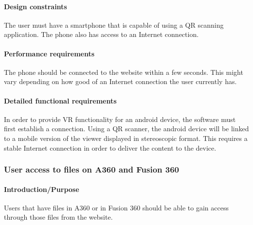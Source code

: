 \documentclass[letterpaper, 10pt, draftclsnofoot, compsoc, onecolumn]{IEEEtran}
\begin{document}
\paragraph[Design constraints of this
feature]{\rmfamily\bfseries\color{black} Design
constraints }
{\color{black}
	The user must have a smartphone that is capable of using a QR scanning application. The phone also has access to an Internet 
	connection. 
}

\paragraph[Performance requirements of this
feature]{\rmfamily\bfseries\color{black}
Performance requirements }
{\color{black}
	The phone should be connected to the website within a few seconds. This might vary depending on how good of an Internet 
	connection the user currently has. 
}

\paragraph[Detailed functional requirements of this
feature]{\rmfamily\bfseries\color{black}
Detailed functional requirements }
{\color{black}
	In order to provide VR functionality for an android device, the software must first establish a connection. Using a QR scanner, 
	the android device will be linked to a mobile version of the viewer displayed in stereoscopic format. This requires a stable 
	Internet connection in order to deliver the content to the device.
 }


\subsubsection[{Data Management}]{\rmfamily\bfseries\color{black}  
	User access to files on A360 and Fusion 360
}

\paragraph[Introduction/Purpose of this
feature]{\rmfamily\bfseries\color{black}
Introduction/Purpose }
{\color{black}
	Users that have files in A360 or in Fusion 360 should be able to gain access through those files from the
	website.
}
\end{document}
